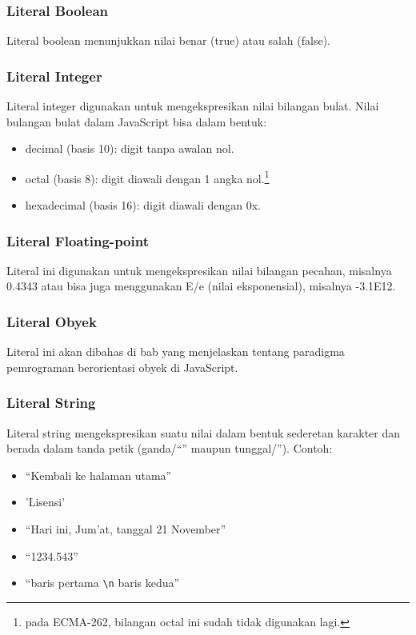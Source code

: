 \subsubsection{Literal Boolean}

Literal boolean menunjukkan nilai benar (true) atau salah (false).

\subsubsection{Literal Integer}

Literal integer digunakan untuk mengekspresikan nilai bilangan bulat. Nilai bulangan bulat dalam JavaScript bisa dalam bentuk:
\begin{itemize}
  \item decimal (basis 10): digit tanpa awalan nol.
  \item octal (basis 8): digit diawali dengan 1 angka nol.\footnote{pada ECMA-262, bilangan octal ini sudah tidak digunakan lagi.}
  \item hexadecimal (basis 16): digit diawali dengan 0x.
\end{itemize}

\subsubsection{Literal Floating-point}

Literal ini digunakan untuk mengekspresikan nilai bilangan pecahan, misalnya 0.4343 atau bisa juga menggunakan E/e (nilai eksponensial), misalnya 
-3.1E12.

\subsubsection{Literal Obyek}

Literal ini akan dibahas di bab yang menjelaskan tentang paradigma pemrograman berorientasi obyek di JavaScript.

\subsubsection{Literal String}

Literal string mengekspresikan suatu nilai dalam bentuk sederetan karakter dan berada dalam tanda petik (ganda/``'' maupun tunggal/''). Contoh:
\begin{itemize}
   \item ``Kembali ke halaman utama''
   \item 'Lisensi'
   \item ``Hari ini, Jum'at, tanggal 21 November''
   \item ``1234.543''
   \item ``baris pertama \verb+\n+ baris kedua''
 \end{itemize}

